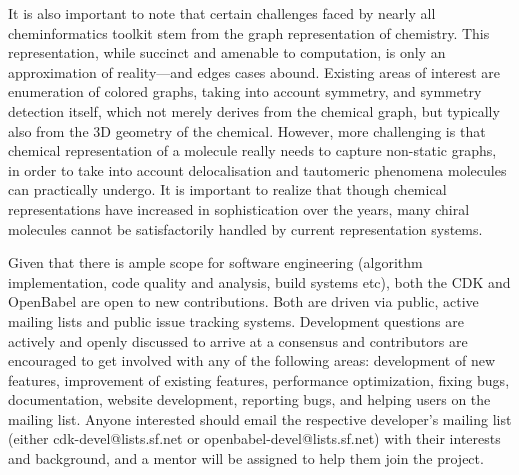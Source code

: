 \documentclass{sig-alternate}
\begin{document}
It is also important to note that certain challenges faced by nearly
all cheminformatics toolkit stem from the graph representation of
chemistry. This representation, while succinct and amenable to
computation, is only an approximation of reality---and edges cases
abound. Existing areas of interest are enumeration of colored graphs,
taking into account symmetry, and symmetry detection itself, which not
merely derives from the chemical graph, but typically also from the 3D
geometry of the chemical. However, more challenging is that chemical
representation of a molecule really needs to capture non-static
graphs, in order to take into account delocalisation and tautomeric
phenomena molecules can practically undergo. It is important to
realize that though chemical representations have increased in
sophistication over the years, many chiral molecules cannot be
satisfactorily handled by current representation systems.


Given that there is ample scope for software engineering (algorithm
implementation, code quality and analysis, build systems etc), both
the CDK and OpenBabel are open to new contributions. Both are driven
via public, active mailing lists and public issue tracking systems.
Development questions are actively and openly discussed to arrive at a
consensus and contributors are encouraged to get involved with any of
the following areas: development of new features, improvement of
existing features, performance optimization, fixing bugs,
documentation, website development, reporting bugs, and helping users
on the mailing list. Anyone interested should email the respective
developer's mailing list (either cdk-devel@lists.sf.net or
openbabel-devel@lists.sf.net) with their interests and background, and
a mentor will be assigned to help them join the project.
\end{document}
